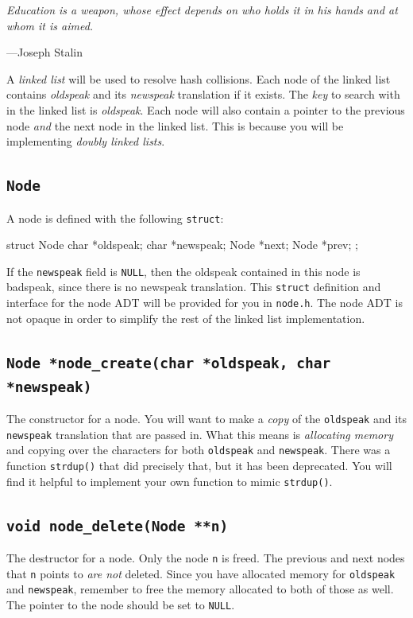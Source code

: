 \documentclass{article}
\begin{document}
\epigraph{\emph{Education is a weapon, whose effect depends on who holds
it in his hands and at whom it is aimed.}}{---Joseph Stalin}

\noindent A \emph{linked list} will be used to resolve hash collisions.
Each node of the linked list contains \emph{oldspeak} and its
\emph{newspeak} translation if it exists. The \emph{key} to search with
in the linked list is \emph{oldspeak}. Each node will also contain a
pointer to the previous node \emph{and} the next node in the linked
list. This is because you will be implementing \emph{doubly linked
lists}.

\subsection{\texttt{Node}}

A node is defined with the following \texttt{struct}:

\begin{codelisting}{}
struct Node {
  char *oldspeak;
  char *newspeak;
  Node *next;
  Node *prev;
};
\end{codelisting}

If the \texttt{newspeak} field is \texttt{NULL}, then the oldspeak
contained in this node is badspeak, since there is no newspeak
translation. This \texttt{struct} definition and interface for the node
ADT will be provided for you in \texttt{node.h}. The node ADT is not
opaque in order to simplify the rest of the linked list implementation.

\subsection{\texttt{Node *node\_create(char *oldspeak, char *newspeak)}}

The constructor for a node. You will want to make a \emph{copy} of the
\texttt{oldspeak} and its \texttt{newspeak} translation that are passed
in. What this means is \emph{allocating memory} and copying over the
characters for both \texttt{oldspeak} and \texttt{newspeak}. There was a
function \texttt{strdup()} that did precisely that, but it has been
deprecated. You will find it helpful to implement your own function to
mimic \texttt{strdup()}.

\subsection{\texttt{void node\_delete(Node **n)}}

The destructor for a node. Only the node \texttt{n} is freed. The
previous and next nodes that \texttt{n} points to \emph{are not}
deleted. Since you have allocated memory for \texttt{oldspeak} and
\texttt{newspeak}, remember to free the memory allocated to both of
those as well. The pointer to the node should be set to \texttt{NULL}.
\end{document}
